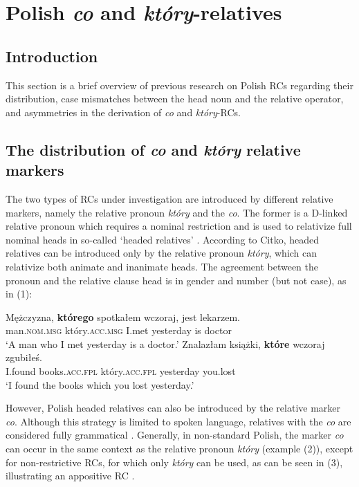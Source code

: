 \documentclass[output=paper]{langsci/langscibook}
\author{Paulina Łęska\affiliation{Adam Mickiewicz University in Poznań}}
\begin{document}
\section{Polish \textit{co} and \textit{który}{}-relatives}%
\subsection{Introduction}%
This section is a brief overview of previous research on Polish RCs regarding their distribution, case mismatches between the head noun and the relative operator, and asymmetries in the derivation of \textit{co} and \textit{który}{}-RCs. 

\subsection{The distribution of \textit{co} and \textit{który} relative markers}%

The two types of RCs under investigation are introduced by different relative markers, namely the relative pronoun \textit{który} and the  \textit{co}. The former is a D-linked relative pronoun which requires a nominal restriction and is used to relativize full nominal heads in so-called ‘headed relatives’ \citep{Citko2004}. According to Citko, headed relatives can be introduced only by the relative pronoun \textit{który}, which can relativize both animate and inanimate heads. The agreement between the pronoun and the relative clause head is in gender and number (but not case), as in (1): 

\ea%
    \label{ex:leska:1}
    \ea
    \gll Mężczyzna, \textbf{którego} spotkałem wczoraj, jest lekarzem.\\
         man.\textsc{nom.msg} który.\textsc{acc.msg} I.met yesterday is doctor\\
    \glt ‘A man who I met yesterday is a doctor.’
\ex
    \gll Znalazłam   książki, \textbf{które}   wczoraj zgubiłeś. \\
         I.found books.\textsc{acc.fpl} który.\textsc{acc.fpl} yesterday you.lost\\
    \glt ‘I found the books which you lost yesterday.’
    \z
\z    

However, Polish headed relatives can also be introduced by the  relative marker \textit{co}. Although this  strategy is limited to spoken language, relatives with the  \textit{co} are considered fully grammatical \citep{Buttler1971}. Generally, in non-standard Polish, the marker \textit{co} can occur in the same context as the relative pronoun \textit{który} (example (2)), except for non-restrictive RCs, for which only \textit{który} can be used, as can be seen in (3), illustrating an appositive RC \citep{Borsley1981,Borsley1984}.
\end{document}
